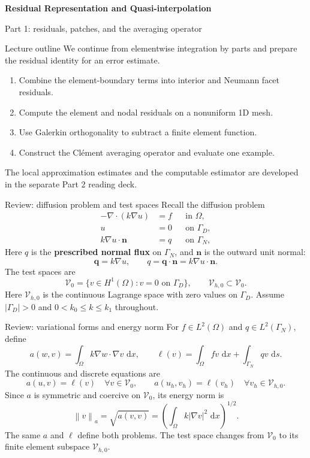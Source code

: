 \documentclass[11pt,aspectratio=169]{beamer}
\newcommand{\dd}{\,\mathrm{d}}
\newcommand{\Om}{\Omega}
\newcommand{\GamD}{\Gamma_D}
\newcommand{\GamN}{\Gamma_N}
\newcommand{\Vzero}{\mathcal V_0}
\newcommand{\Vhzero}{\mathcal V_{h,0}}
\newcommand{\norm}[2][]{\left\lVert#2\right\rVert_{#1}}
\newcommand{\grad}{\nabla}
\newcommand{\divg}{\nabla\!\cdot}
\newcommand{\bn}{\bm n}
\newcommand{\bq}{\bm q}
\begin{document}
\begin{frame}[plain]
  \centering\vfill
  {\LARGE\bfseries Residual Representation and Quasi-interpolation\par}
  \vspace{0.45cm}
  {\large Part 1: residuals, patches, and the averaging operator\par}
  \vfill
\end{frame}

\begin{frame}{Lecture outline}
We continue from elementwise integration by parts and prepare the residual
identity for an error estimate.
\begin{enumerate}
  \item Combine the element-boundary terms into interior and Neumann
  facet residuals.
  \item Compute the element and nodal residuals on a nonuniform 1D mesh.
  \item Use Galerkin orthogonality to subtract a finite element function.
  \item Construct the Cl\'{e}ment averaging operator and evaluate one example.
\end{enumerate}
The local approximation estimates and the computable estimator are developed
in the separate Part 2 reading deck.
\end{frame}

\begin{frame}{Review: diffusion problem and test spaces}
Recall the diffusion problem
\[
\begin{aligned}
 -\divg(k\grad u)&=f &&\text{in }\Om,\\
 u&=0 &&\text{on }\GamD,\\
 k\grad u\cdot\bn&=q &&\text{on }\GamN,
\end{aligned}
\]
Here $q$ is the \textbf{prescribed normal flux} on $\GamN$, and $\bn$ is the
outward unit normal:
\[
 \bq=k\grad u,\qquad q=\bq\cdot\bn=k\grad u\cdot\bn.
\]
The test spaces are
\[
 \Vzero=\{v\in H^1(\Om):v=0\text{ on }\GamD\},
 \qquad \Vhzero\subset\Vzero.
\]
Here $\Vhzero$ is the continuous Lagrange space with zero values on $\GamD$.
Assume $|\GamD|>0$ and $0<k_0\leq k\leq k_1$ throughout.
\end{frame}

\begin{frame}{Review: variational forms and energy norm}
For $f\in L^2(\Om)$ and $q\in L^2(\GamN)$, define
\[
 a(w,v)=\int_\Om k\grad w\cdot\grad v\,\dd x,
 \qquad
 \ell(v)=\int_\Om fv\,\dd x+\int_{\GamN}qv\,\dd s.
\]
The continuous and discrete equations are
\[
 a(u,v)=\ell(v)\quad\forall v\in\Vzero,
 \qquad
 a(u_h,v_h)=\ell(v_h)\quad\forall v_h\in\Vhzero.
\]
Since $a$ is symmetric and coercive on $\Vzero$, its energy norm is
\[
 \norm[a]{v}=\sqrt{a(v,v)}
 =\left(\int_\Om k|\grad v|^2\,\dd x\right)^{1/2}.
\]
The same $a$ and $\ell$ define both problems. The test space changes from
$\Vzero$ to its finite element subspace $\Vhzero$.
\end{frame}
\end{document}
